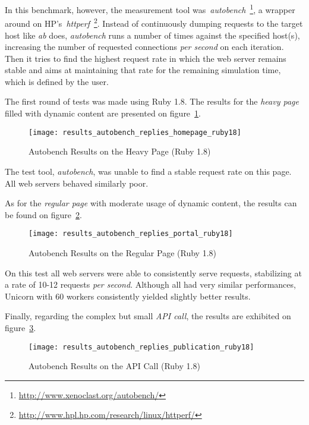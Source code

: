In this benchmark, however, the measurement tool was~\textit{autobench}~\footnote{\url{http://www.xenoclast.org/autobench/}}, a wrapper around on HP's~\textit{httperf}~\footnote{\url{http://www.hpl.hp.com/research/linux/httperf/}}. Instead of continuously dumping requests to the target host like \textit{ab} does, \textit{autobench} runs a number of times against the specified host(s), increasing the number of requested connections \textit{per second} on each iteration. Then it tries to find the highest request rate in which the web server remains stable and aims at maintaining that rate for the remaining simulation time, which is defined by the user.

The first round of tests was made using Ruby 1.8. The results for the \textit{heavy page} filled with dynamic content are presented on figure~\ref{fig:page1_autobench_ruby18_results}.
\begin{figure}[h!t]
  \centering
    \texttt{[image: results\_autobench\_replies\_homepage\_ruby18]}
    \caption{Autobench Results on the Heavy Page (Ruby 1.8)} \label{fig:page1_autobench_ruby18_results}
\end{figure}

The test tool, \textit{autobench}, was unable to find a stable request rate on this page. All web servers behaved similarly poor. 

As for the \textit{regular page} with moderate usage of dynamic content, the results can be found on figure~\ref{fig:page2_autobench_ruby18_results}.
\begin{figure}[h!t]
  \centering
    \texttt{[image: results\_autobench\_replies\_portal\_ruby18]}
    \caption{Autobench Results on the Regular Page (Ruby 1.8)} \label{fig:page2_autobench_ruby18_results}
\end{figure}

On this test all web servers were able to consistently serve requests, stabilizing at a rate of 10-12 requests \textit{per second}. Although all had very similar performances, Unicorn with 60 workers consistently yielded slightly better results.

Finally, regarding the complex but small \textit{API call}, the results are exhibited on figure~\ref{fig:page3_autobench_ruby18_results}.
\begin{figure}[h!t]
  \centering
    \texttt{[image: results\_autobench\_replies\_publication\_ruby18]}
    \caption{Autobench Results on the API Call (Ruby 1.8)} \label{fig:page3_autobench_ruby18_results}
\end{figure}

